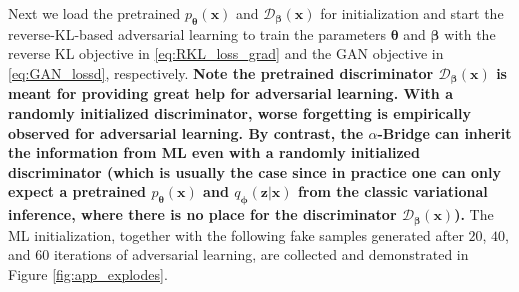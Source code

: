 \documentclass[letterpaper]{article} %
\newcommand{\Dc}[0]{\ensuremath{\mathcal{D}} }
\newcommand{\xv}[0]{\ensuremath{\boldsymbol{x}} }
\newcommand{\zv}[0]{\ensuremath{\boldsymbol{z}} }
\newcommand{\betav}[0]{\ensuremath{\boldsymbol{\beta}} }
\newcommand{\thetav}[0]{\ensuremath{\boldsymbol{\theta}} }
\newcommand{\phiv}[0]{\ensuremath{\boldsymbol{\phi}} }
\begin{document}
Next we load the pretrained $p_{\thetav}(\xv)$ and $\Dc_{\betav}(\xv)$ for initialization and start the reverse-KL-based adversarial learning to train the parameters $\thetav$ and $\betav$ with the reverse KL objective in \eqref{eq:RKL_loss_grad} and the GAN objective in \eqref{eq:GAN_lossd}, respectively.
\textbf{Note the pretrained discriminator $\Dc_{\betav}(\xv)$ is meant for providing great help for adversarial learning. With a randomly initialized discriminator, worse forgetting is empirically observed for adversarial learning. By contrast, the $\alpha$-Bridge can inherit the information from ML even with a randomly initialized discriminator (which is usually the case since in practice one can only expect a pretrained $p_{\thetav}(\xv)$ and $q_{\phiv}(\zv|\xv)$ from the classic variational inference, where there is no place for the discriminator $\Dc_{\betav}(\xv)$).} The ML initialization, together with the following fake samples generated after $20$, $40$, and $60$ iterations of adversarial learning, are collected and demonstrated in Figure \ref{fig:app_explodes}.
\end{document}
